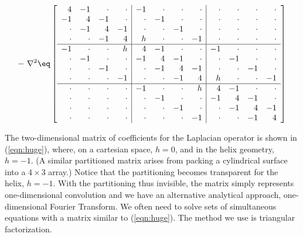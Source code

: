 \begin{equation}
\label{eqn:huge}
-\ \nabla^2 \eq
\left[
\begin{array}{rrrr|rrrr|rrrr}
  4 & -1 & \cdot & \cdot 
& -1 & \cdot & \cdot & \cdot 
& \cdot & \cdot & \cdot & \cdot  \\
  -1  &   4  &   -1     &  \cdot 
&  \cdot &-1 & \cdot  & \cdot 
& \cdot  &  \cdot  &  \cdot &  \cdot    \\
\cdot & -1  &   4  & -1  
&  \cdot  &  \cdot &-1  &  \cdot 
&  \cdot  &  \cdot  &  \cdot  &  \cdot   \\
\cdot &  \cdot & -1 &   4  
&  h  &  \cdot  &  \cdot &-1 
&  \cdot  &  \cdot  &  \cdot  &  \cdot  \\
\hline
  -1  &  \cdot  &  \cdot  &  h 
&   4   &  -1   &  \cdot  &  \cdot 
& -1  &  \cdot  &  \cdot &  \cdot 
\\
   \cdot &-1 & \cdot  &  \cdot 
& -1  &   4  &   -1     &  \cdot 
&  \cdot &-1 & \cdot  &  \cdot 
\\
  \cdot  &  \cdot &-1  &  \cdot 
&  \cdot &   -1     &   4   & -1  
& \cdot  &  \cdot &-1  &  \cdot 
\\
  \cdot  &  \cdot  &  \cdot &-1 
& \cdot  &  \cdot  & -1  &   4  
& h  &  \cdot  &  \cdot &-1 
\\
\hline
  \cdot  &  \cdot  &  \cdot  &  \cdot 
& -1  &  \cdot  &  \cdot  &  h 
&   4   &  -1   &  \cdot  &  \cdot 
\\
  \cdot  &  \cdot  &  \cdot  &  \cdot 
&  \cdot &-1 & \cdot  &  \cdot 
& -1  &   4  &   -1     &  \cdot 
\\
  \cdot  &  \cdot  &  \cdot  &  \cdot 
& \cdot  &  \cdot &-1  &  \cdot 
&  \cdot &   -1     &   4   & -1  
\\
  \cdot  &  \cdot  &  \cdot  &  \cdot 
& \cdot  &  \cdot  &  \cdot &-1 
& \cdot  &  \cdot  & -1  &   4  
\end{array}
\right]
\end{equation}












\par\noindent
The two-dimensional matrix of coefficients for the Laplacian operator
is shown in (\ref{eqn:huge}),
where, 
on a cartesian space, $h=0$,
and in the helix geometry, $h=-1$.
(A similar partitioned matrix arises from packing
a cylindrical surface into a $4\times3$ array.)
Notice that the partitioning becomes transparent for the helix, $h=-1$.
With the partitioning thus invisible, the matrix
simply represents one-dimensional convolution
and we have an alternative analytical approach,
one-dimensional Fourier Transform.
We often need to solve sets of simultaneous equations
with a matrix similar to (\ref{eqn:huge}).
The method we use is triangular factorization.

